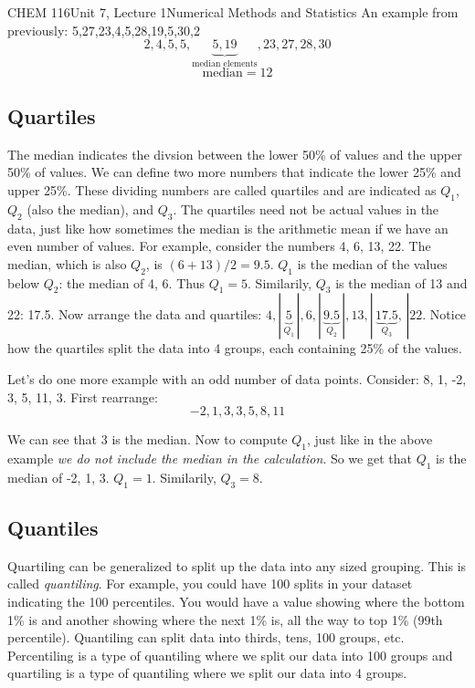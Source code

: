 \documentclass{article}
\begin{document}
\begin{tdoc}{CHEM 116}{Unit 7, Lecture 1}{Numerical Methods and Statistics}
An example from previously: 5,27,23,4,5,28,19,5,30,2
\[
2,4,5,5,\underbrace{5,19}_{\textrm{median elements}},23,27,28,30
\]
\[
\textrm{median} = 12
\]

\subsection{Quartiles}

The median indicates the divsion between the lower 50\% of values and the upper 50\% of values. We can define two more numbers that indicate the lower 25\% and upper 25\%. These dividing numbers are called quartiles and are indicated as $Q_1$, $Q_2$ (also the median), and $Q_3$. The quartiles need not be actual values in the data, just like how sometimes the median is the arithmetic mean if we have an even number of values. For example, consider the numbers 4, 6, 13, 22. The median, which is also $Q_2$, is $(6 + 13) / 2 = 9.5$. $Q_1$ is the median of the values below $Q_2$: the median of 4, 6. Thus $Q_1 = 5$. Similarily, $Q_3$ is the median of 13 and 22: 17.5. Now arrange the data and quartiles: $ 4, |\,\underbrace{5}_{Q_1}\,|, 6, |\,\underbrace{9.5}_{Q_2}\,|, 13, |\,\underbrace{17.5}_{Q_3},\,| 22$. Notice how the quartiles split the data into 4 groups, each containing 25\% of the values.

Let's do one more example with an odd number of data points. Consider: 8, 1, -2, 3, 5, 11, 3. First rearrange:
\[
-2, 1, 3, 3, 5, 8, 11
\]

We can see that $3$ is the median. Now to compute $Q_1$, just like in the above example \textit{we do not include the median in the calculation}. So we get that $Q_1$ is the median of -2, 1, 3. $Q_1 = 1$. Similarily, $Q_3 = 8$.

\subsection{Quantiles}

Quartiling can be generalized to split up the data into any sized grouping. This is called \textit{quantiling}. For example, you could have 100 splits in your dataset indicating the 100 percentiles. You would have a value showing where the bottom 1\% is and another showing where the next 1\% is, all the way to top 1\% (99th percentile). Quantiling can split data into thirds, tens, 100 groups, etc. Percentiling is a type of quantiling where we split our data into 100 groups and quartiling is a type of quantiling where we split our data into 4 groups.

\end{tdoc}
\end{document}
